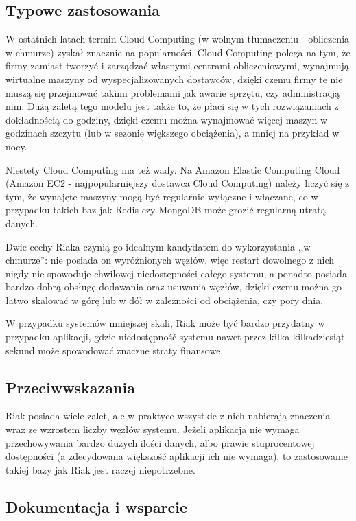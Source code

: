 \subsection*{Typowe zastosowania}

W ostatnich latach termin Cloud Computing (w wolnym tłumaczeniu - obliczenia w chmurze) zyskał znacznie na popularności.
Cloud Computing polega na tym, że firmy zamiast tworzyć i zarządzać własnymi centrami obliczeniowymi, wynajmują wirtualne maszyny od wyspecjalizowanych dostawców, dzięki czemu firmy te nie muszą się przejmować takimi problemami jak awarie sprzętu, czy administracją nim.
Dużą zaletą tego modelu jest także to, że płaci się w tych rozwiązaniach z dokładnością do godziny, dzięki czemu można wynajmować więcej maszyn w godzinach szczytu (lub w sezonie większego obciążenia), a mniej na przykład w nocy.

Niestety Cloud Computing ma też wady.
Na Amazon Elastic Computing Cloud (Amazon EC2 - najpopularniejszy dostawca Cloud Computing) należy liczyć się z tym, że wynajęte maszyny mogą być regularnie wyłączne i włączane, co w przypadku takich baz jak Redis czy MongoDB może grozić regularną utratą danych.

Dwie cechy Riaka czynią go idealnym kandydatem do wykorzystania ,,w chmurze'': nie posiada on wyróżnionych węzłów, więc restart dowolnego z nich nigdy nie spowoduje chwilowej niedostępności całego systemu, a ponadto posiada bardzo dobrą obsługę dodawania oraz usuwania węzłów, dzięki czemu można go łatwo skalować w górę lub w dół w zależności od obciążenia, czy pory dnia.

W przypadku systemów mniejszej skali, Riak może być bardzo przydatny w przypadku aplikacji, gdzie niedostępność systemu nawet przez kilka-kilkadziesiąt sekund może spowodować znaczne straty finansowe.

\subsection*{Przeciwwskazania}

Riak posiada wiele zalet, ale w praktyce wszystkie z nich nabierają znaczenia wraz ze wzrostem liczby węzłów systemu.
Jeżeli aplikacja nie wymaga przechowywania bardzo dużych ilości danych, albo prawie stuprocentowej dostępności (a zdecydowana większość aplikacji ich nie wymaga), to zastosowanie takiej bazy jak Riak jest raczej niepotrzebne.

\subsection*{Dokumentacja i wsparcie}

